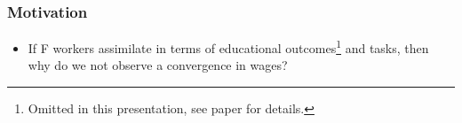 \documentclass[10pt]{beamer}
\begin{document}
\begin{frame} 
	\frametitle{Motivation}
	
	
	\begin{itemize}
		\item If F workers assimilate in terms of educational outcomes\footnote[frame]{Omitted in this presentation, see paper for details.} and tasks, then why do we not observe a convergence in wages?
		
		
		
	\end{itemize}
	
\end{frame}

\end{document}

